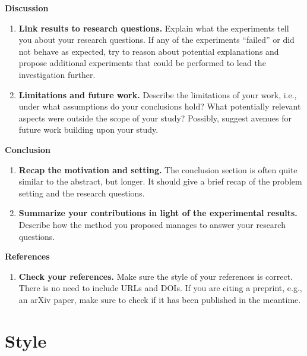 \documentclass[twoside,11pt]{article}
\begin{document}
\noindent\textbf{Discussion}
\begin{enumerate}
    \item \textbf{Link results to research questions.} Explain what the experiments tell you about your research questions. If any of the experiments ``failed'' or did not behave as expected, try to reason about potential explanations and propose additional experiments that could be performed to lead the investigation further.
    \item \textbf{Limitations and future work.} Describe the limitations of your work, i.e., under what assumptions do your conclusions hold? What potentially relevant aspects were outside the scope of your study? Possibly, suggest avenues for future work building upon your study.
\end{enumerate}

\noindent\textbf{Conclusion}
\begin{enumerate}
    \item \textbf{Recap the motivation and setting.} The conclusion section is often quite similar to the abstract, but longer. It should give a brief recap of the problem setting and the research questions.
    \item \textbf{Summarize your contributions in light of the experimental results.} Describe how the method you proposed manages to answer your research questions.
\end{enumerate}

\noindent\textbf{References}
\begin{enumerate}
    \item \textbf{Check your references.} Make sure the style of your references is correct. There is no need to include URLs and DOIs. If you are citing a preprint, e.g., an arXiv paper, make sure to check if it has been published in the meantime. 
\end{enumerate}

\section{Style}
\end{document}

